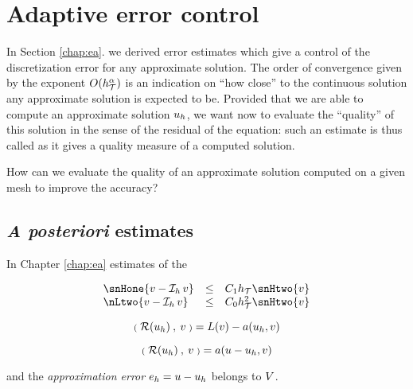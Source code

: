 
\chapter{Adaptive error control}\label{chap:aec}

In Section \ref{chap:ea}. we derived \apriori error estimates which give a control of the discretization error for any approximate solution.
The order of convergence given by the exponent $O(h_{\mathcal T}^\alpha)$ is an indication on ``how close'' to the continuous solution any approximate solution is expected to be.
Provided that we are able to compute an approximate solution ${u_h}$, we want now to evaluate the ``quality'' of this solution in the sense of the residual of the equation: such an estimate is thus called \aposteriori as it gives a quality measure of a computed solution.

\medskip
\Question How can we evaluate the quality of an approximate solution computed on a given mesh to improve the accuracy?

\section{\textit{A posteriori} estimates}

In Chapter \ref{chap:ea} estimates of the 

\begin{equation*}
\begin{array}{lcl}
\snHone{v - \Iop{h} v} &\leq& C_1 \sizeT   \snHtwo{v} \\
  \nLtwo{v - \Iop{h} v} &\leq& C_0 \sizeT^2 \snHtwo{v}
\end{array}
\end{equation*}


\[
{{\scriptstyle\mathbf{(}}\;{\mathcal{R}({u_h})}\:,\: v \;{\scriptstyle\mathbf{)}}} = L(v) - a({u_h},  v)
\]

\[
{{\scriptstyle\mathbf{(}}\;{\mathcal{R}({u_h})}\:,\: v \;{\scriptstyle\mathbf{)}}} = a(u - {u_h},  v)
\]

and the \textit{approximation error} $e_h = u - {u_h}$ belongs to ${V}$.



